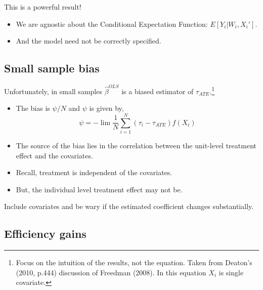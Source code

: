 \documentclass[
  letterpaper,
  DIV=11,
  numbers=noendperiod]{scrreprt}
\providecommand{\tightlist}{%
  \setlength{\itemsep}{0pt}\setlength{\parskip}{0pt}}\usepackage{longtable,booktabs,array}
\theoremstyle{definition}
\theoremstyle{remark}
\begin{document}
This is a powerful result!

\par

\begin{itemize}
\tightlist
\item
  We are agnostic about the Conditional Expectation Function:
  \(E[Y_i|W_i,X_i']\).
\item
  And the model need not be correctly specified.
\end{itemize}

\subsection{Small sample bias}\label{small-sample-bias}

Unfortunately, in small samples \(\hat{\beta}^{OLS}\) is a biased
estimator of \(\tau_{ATE}\).\footnote{Focus on the intuition of the
  results, not the equation. Taken from Deaton's (2010, p.444)
  discussion of Freedman (2008). In this equation \(X_i\) is single
  covariate.}

\begin{itemize}
\tightlist
\item
  The bias is \(\psi/N\) and \(\psi\) is given by, \[
              \psi = -\lim \frac{1}{N}\sum_{i=1}^N (\tau_i-\tau_{ATE})f(X_i)
  \]
\item
  The source of the bias lies in the correlation between the unit-level
  treatment effect and the covariates.
\item
  Recall, treatment is independent of the covariates.
\item
  But, the individual level treatment effect may not be.
\end{itemize}

\begin{tcolorbox}[enhanced jigsaw, bottomrule=.15mm, coltitle=black, arc=.35mm, left=2mm, opacityback=0, leftrule=.75mm, colbacktitle=quarto-callout-tip-color!10!white, title={In practice}, toprule=.15mm, bottomtitle=1mm, breakable, colframe=quarto-callout-tip-color-frame, opacitybacktitle=0.6, titlerule=0mm, colback=white, rightrule=.15mm, toptitle=1mm]

Include covariates and be wary if the estimated coefficient changes
substantially.

\end{tcolorbox}

\subsection{Efficiency gains}\label{efficiency-gains}
\end{document}
